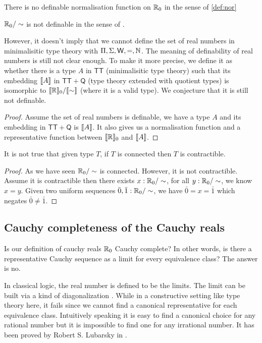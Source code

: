 \begin{corollary}
 There is no definable normalisation function on $\mathbb{R}_0$ in the sense
 of \ref{def:nor}
\end{corollary}

\begin{corollary}
 $\mathbb{R}_0 / \sim$ is not definable in the sense of \cite{aan}.
\end{corollary}


However, it doesn't imply that we cannot define the set of real numbers in minimalisitic type theory with $\Pi, \Sigma, \mathsf{W}, =,
\mathbb{N}$. The meaning of definability of real numbers is still not clear enough. To make it more precise, we define
it as whether there is a type $A$ in $\mathsf{TT}$ (minimalisitic type
theory) such that its embedding $\llbracket A\rrbracket$ in $\mathsf{TT} + \mathsf{Q}$ (type theory
extended with quotient types) is isomorphic to $\llbracket \mathbb{R}\rrbracket_0
/ \llbracket \sim\rrbracket$ (where it is a valid type). We conjecture that it is still not
definable.

\begin{proof}
Assume the set of real numbers is definable, we have a type $A$ and
its embedding in $\mathsf{TT} + \mathsf{Q}$  is $\llbracket A\rrbracket$. It also
gives us a normalisation function and a representative function
between $\llbracket \mathbb{R}\rrbracket_0$ and $\llbracket A\rrbracket$.
\end{proof}

\begin{proposition}
It is not true that given type $T$, if $T$ is connected then $T$ is contractible.
\end{proposition}
\begin{proof}
As we have seen $ \mathbb{R}_0 / \sim$ is connected. However, it is not
contractible.
Assume it is contractible then there exists $x : \mathbb{R}_0 / \sim$, for
all $y : \mathbb{R}_0 / \sim$, we know $x = y$. Given two uniform sequences
$\bar{0} , \bar{1} : \mathbb{R}_0 / \sim$, we have $\bar{0}  = x = \bar{1}$
which negates $\bar{0} \ne \bar{1}$.
\end{proof}

\subsection{Cauchy completeness of the Cauchy reals}


Is our definition of cauchy reals $\mathbb{R}_0$ Cauchy complete? In other
words, is there a representative Cauchy sequence as a limit for every
equivalence class? The answer is no.

In classical logic, the real number is defined to be the limits. The
limit can be built via a kind of diagonalization
\cite{DBLP:journals/entcs/Lubarsky07}.
While in a constructive setting like type theory here, it fails since
we cannot find a canonical representative for each equivalence
class. Intuitively speaking it is easy to find a canonical choice for
any rational number but it is impossible to find one for any
irrational number. It has been proved by Robert S. Lubarsky in
\cite{DBLP:journals/entcs/Lubarsky07}.

